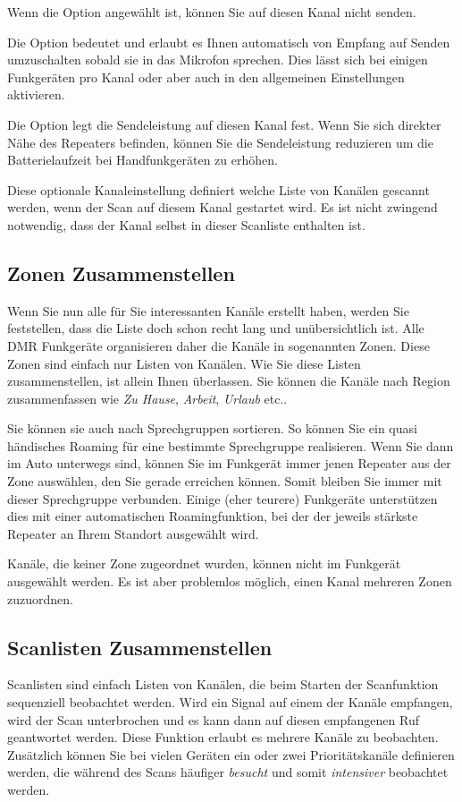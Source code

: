 Wenn die Option  angewählt ist, können Sie auf diesen Kanal nicht senden.

Die Option  bedeutet  und erlaubt es Ihnen automatisch von Empfang auf Senden umzuschalten sobald sie in das Mikrofon sprechen. Dies lässt sich bei einigen Funkgeräten pro Kanal oder aber auch in den allgemeinen Einstellungen aktivieren.

Die Option  legt die Sendeleistung auf diesen Kanal fest. Wenn Sie sich direkter Nähe des Repeaters befinden, können Sie die Sendeleistung reduzieren um die Batterielaufzeit bei Handfunkgeräten zu erhöhen. 

Diese optionale Kanaleinstellung  definiert welche Liste von Kanälen gescannt werden, wenn der Scan auf diesem Kanal gestartet wird. Es ist nicht zwingend notwendig, dass der Kanal selbst in dieser Scanliste enthalten ist.


\subsection{Zonen Zusammenstellen} \label{sec:zone} 
Wenn Sie nun alle für Sie interessanten Kanäle erstellt haben, werden Sie feststellen, dass die Liste doch schon recht lang und unübersichtlich ist. Alle DMR Funkgeräte organisieren daher die Kanäle in sogenannten Zonen. Diese Zonen sind einfach nur Listen von Kanälen. Wie Sie diese Listen zusammenstellen, ist allein Ihnen überlassen. Sie können die Kanäle nach Region zusammenfassen wie \emph{Zu Hause}, \emph{Arbeit}, \emph{Urlaub} etc.. 

Sie können sie auch nach Sprechgruppen sortieren. So können Sie ein quasi händisches Roaming für eine bestimmte Sprechgruppe realisieren. Wenn Sie dann im Auto unterwegs sind, können Sie im Funkgerät immer jenen Repeater aus der Zone auswählen, den Sie gerade erreichen können. Somit bleiben Sie immer mit dieser Sprechgruppe verbunden. Einige (eher teurere) Funkgeräte unterstützen dies mit einer automatischen Roamingfunktion, bei der der jeweils stärkste Repeater an Ihrem Standort ausgewählt wird.

\begin{hinweis}
 Kanäle, die keiner Zone zugeordnet wurden, können nicht im Funkgerät ausgewählt werden. Es ist aber problemlos möglich, einen Kanal mehreren Zonen zuzuordnen.
\end{hinweis}

\subsection{Scanlisten Zusammenstellen}
Scanlisten sind einfach Listen von Kanälen, die beim Starten der Scanfunktion sequenziell beobachtet werden. Wird ein Signal auf einem der Kanäle empfangen, wird der Scan unterbrochen und es kann dann auf diesen empfangenen Ruf geantwortet werden. Diese Funktion erlaubt es mehrere Kanäle zu beobachten. Zusätzlich können Sie bei vielen Geräten ein oder zwei Prioritätskanäle definieren werden, die während des Scans häufiger \emph{besucht} und somit \emph{intensiver} beobachtet werden.

